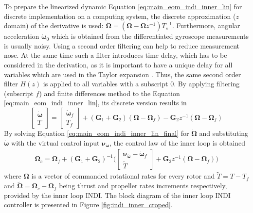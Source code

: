 \documentclass[11pt, a4paper, twoside]{report}
\begin{document}
To prepare the linearized dynamic Equation \ref{eq:main_eom_indi_inner_lin} for discrete implementation on a computing system, the discrete approximation ($z$ domain) of the derivative is used: $\bm{\dot{\Omega}} = (\bm{\Omega} - \bm{\Omega}z^{-1})T_s^{-1}$. Furthermore, angular acceleration $\bm{\dot{\omega}}_0$ which is obtained from the differentiated gyroscope measurements is usually noisy. Using a second order filtering can help to reduce measurement nose. At the same time such a filter introduces time delay, which has to be considered in the derivation, as it is important to have a unique delay for all variables which are used in the Taylor expansion \cite{Smeur1}. Thus, the same second order filter $H(z)$ is applied to all variables with a subscript $0$. By applying filtering (subscript $f$) and finite differences method to the Equation \ref{eq:main_eom_indi_inner_lin}, its discrete version results in
\begin{equation}
	\begin{bmatrix}
		\bm{\dot{\omega}}\\
		T
	\end{bmatrix} = 
	\begin{bmatrix}
		\bm{\dot{\omega}}_f\\
		T_f
	\end{bmatrix} + (\bm{G}_1+\bm{G}_2)(\bm{\Omega} - \bm{\Omega}_f) - \bm{G}_2z^{-1}(\bm{\Omega} - \bm{\Omega}_f)
	\label{eq:main_eom_indi_inner_lin_final}
\end{equation}
By solving Equation \ref{eq:main_eom_indi_inner_lin_final} for $\bm{\dot{\Omega}}$ and substituting $\bm{\dot{\omega}}$ with the virtual control input $\bm{\nu}_{\bm{\dot{\omega}}}$, the control law of the inner loop is obtained
\begin{equation}
	\begin{split}
		\bm{\Omega}_c = \bm{\Omega}_f + (\bm{G}_1+\bm{G}_2)^{-1} \Bigg(
		\begin{bmatrix}
			\bm{\nu}_{\bm{\dot{\omega}}} - \bm{\dot{\omega}}_f\\
			\tilde{T}
		\end{bmatrix} + \bm{G}_2z^{-1}(\bm{\Omega} - \bm{\Omega}_f) \Bigg)
		\label{eq:indi_inner_control_law}	
	\end{split}
\end{equation}
where $\bm{\Omega}$ is a vector of commanded rotational rates for every rotor and  $\tilde{T} = T - T_f$ and $\tilde{\bm{\Omega}} = \bm{\Omega}_c - \bm{\Omega}_f$ being thrust and propeller rates increments respectively, provided by the inner loop \acrshort{INDI}. The block diagram of the inner loop \acrshort{INDI} controller is presented in Figure \ref{fig:indi_inner_croped}.
\end{document}
